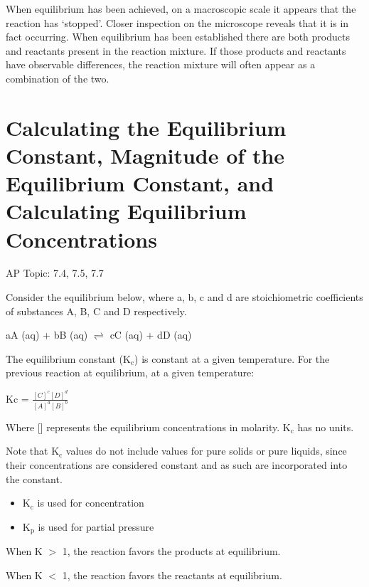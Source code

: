 \documentclass[../chem.tex]{subfiles}
\begin{document}
When equilibrium has been achieved, on a macroscopic scale it appears that the reaction has `stopped'. Closer inspection on the microscope 
reveals that it is in fact occurring. When equilibrium has been established there are both products and reactants present in the reaction mixture.
If those products and reactants have observable differences, the reaction mixture will often appear as a combination of the two.

\section{Calculating the Equilibrium Constant, Magnitude of the Equilibrium Constant, and Calculating Equilibrium Concentrations}
AP Topic: 7.4, 7.5, 7.7

Consider the equilibrium below, where a, b, c and d are stoichiometric coefficients of substances A, B, C and D respectively.
\begin{center}
    aA (aq) + bB (aq) $\rightleftharpoons$ cC (aq) + dD (aq)
\end{center}

The equilibrium constant (K$_{\text{c}}$) is constant at a given temperature. For the previous reaction at equilibrium, at a given temperature:
\begin{center}
    Kc = $\frac{[C]^c[D]^d}{[A]^a[B]^b}$
\end{center}

Where [] represents the equilibrium concentrations in molarity. K$_{\text{c}}$ has no units.

Note that K$_{\text{c}}$ values do not include values for pure solids or pure liquids, since their concentrations are considered constant and as such are incorporated into the constant.
\begin{itemize}
    \item K$_{\text{c}}$ is used for concentration 
    \item K$_{\text{p}}$ is used for partial pressure
\end{itemize}

When K $>$ 1, the reaction favors the products at equilibrium.

When K $<$ 1, the reaction favors the reactants at equilibrium.
\end{document}
